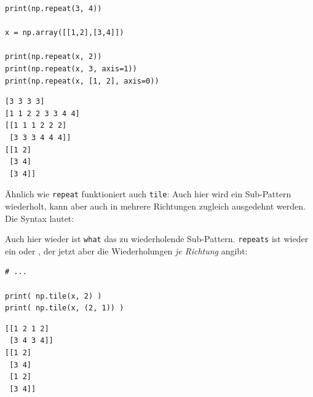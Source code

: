 \begin{tcbraster}[raster columns=2,
                  raster equal height,
                  nobeforeafter,
                  raster column skip=0.5cm]
\begin{codebox}
\begin{verbatim}
print(np.repeat(3, 4))

x = np.array([[1,2],[3,4]])

print(np.repeat(x, 2))
print(np.repeat(x, 3, axis=1))
print(np.repeat(x, [1, 2], axis=0))
\end{verbatim}
\end{codebox}
%
\begin{cmdbox}
\begin{verbatim}
[3 3 3 3]
[1 1 2 2 3 3 4 4]
[[1 1 1 2 2 2]
 [3 3 3 4 4 4]]
[[1 2]
 [3 4]
 [3 4]]
\end{verbatim}
\end{cmdbox}
\end{tcbraster}

Ähnlich wie \texttt{repeat} funktioniert auch \texttt{tile}: Auch hier wird ein Sub-Pattern wiederholt, kann aber auch in mehrere Richtungen zugleich ausgedehnt werden. Die Syntax lautet:

\begin{center}
\end{center}
Auch hier wieder ist \texttt{what} das zu wiederholende Sub-Pattern. \texttt{repeats} ist wieder ein  oder , der jetzt aber die Wiederholungen \emph{je Richtung} angibt:

\begin{tcbraster}[raster columns=2,
                  raster equal height,
                  nobeforeafter,
                  raster column skip=0.5cm]
\begin{codebox}
\begin{verbatim}
# ...

print( np.tile(x, 2) )
print( np.tile(x, (2, 1)) )
\end{verbatim}
\end{codebox}
%
\begin{cmdbox}
\begin{verbatim}
[[1 2 1 2]
 [3 4 3 4]]
[[1 2]
 [3 4]
 [1 2]
 [3 4]]
\end{verbatim}
\end{cmdbox}
\end{tcbraster}

